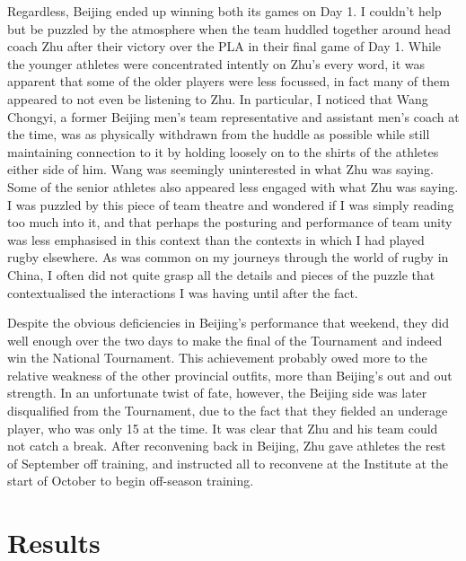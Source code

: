 \begin{CJK}{UTF8}{gbsn}
Regardless, Beijing ended up winning both its games on Day 1. I couldn't help but be puzzled by the atmosphere when the team huddled together around head coach Zhu after their victory over the PLA in their final game of Day 1.  While the younger athletes were concentrated intently on Zhu's every word, it was apparent that some of the older players were less focussed, in fact many of them appeared to not even be listening to Zhu.  In particular, I noticed that Wang Chongyi, a former Beijing men's team representative and assistant men's coach at the time, was as physically withdrawn from the huddle as possible while still maintaining connection to it by holding loosely on to the shirts of the athletes either side of him. Wang was seemingly uninterested in what Zhu was saying.  Some of the senior athletes also appeared less engaged with what Zhu was saying.  I was puzzled by this piece of team theatre and wondered if I was simply reading too much into it, and that perhaps the posturing and performance of team unity was less emphasised in this context than the contexts in which I had played rugby elsewhere. As was common on my journeys through the world of rugby in China, I often did not quite grasp all the details and pieces of the puzzle that contextualised the interactions I was having until after the fact.

Despite the obvious deficiencies in Beijing's performance that weekend, they did well enough over the two days to make the final of the Tournament and indeed win the National Tournament.  This achievement probably owed more to the relative weakness of the other provincial outfits, more than Beijing's out and out strength.  In an unfortunate twist of fate, however, the Beijing side was later disqualified from the Tournament, due to the fact that they fielded an underage player, who was only 15 at the time.  It was clear that Zhu and his team could not catch a break.  After reconvening back in Beijing, Zhu gave athletes the rest of September off training, and instructed all to reconvene at the Institute at the start of October to begin off-season training.











\section{Results}


\end{CJK}
